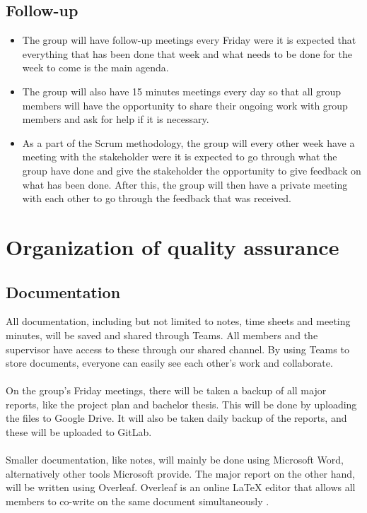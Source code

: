 \subsection{Follow-up}
\begin{itemize}
    \item The group will have follow-up meetings every Friday were it is expected that everything that has been done that week and what needs to be done for the week to come is the main agenda. 
    \item The group will also have 15 minutes meetings every day so that all group members will have the opportunity to share their ongoing work with group members and ask for help if it is necessary. 
    \item As a part of the Scrum methodology, the group will every other week have a meeting with the stakeholder were it is expected to go through what the group have done and give the stakeholder the opportunity to give feedback on what has been done. After this, the group will then have a private meeting with each other to go through the feedback that was received. 
\end{itemize}


\newpage
\section{Organization of quality assurance}
\subsection{Documentation}
All documentation, including but not limited to notes, time sheets and meeting minutes, will be saved and shared through Teams. All members and the supervisor have access to these through our shared channel. By using Teams to store documents, everyone can easily see each other's work and collaborate.
\\~\\
On the group's Friday meetings, there will be taken a backup of all major reports, like the project plan and bachelor thesis. This will be done by uploading the files to Google Drive. It will also be taken daily backup of the reports, and these will be uploaded to GitLab. 
\\~\\
Smaller documentation, like notes, will mainly be done using Microsoft Word, alternatively other tools Microsoft provide. The major report on the other hand, will be written using Overleaf. Overleaf is an online LaTeX editor that allows all members to co-write on the same document simultaneously \cite{overleaf}.
